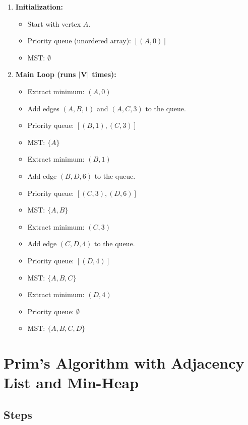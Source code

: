 \documentclass{article}
\begin{document}
\begin{enumerate}
    \item \textbf{Initialization:}
    \begin{itemize}
        \item Start with vertex \( A \).
        \item Priority queue (unordered array): \( [(A, 0)] \)
        \item MST: \( \emptyset \)
    \end{itemize}
    \item \textbf{Main Loop (runs |V| times):}
    \begin{itemize}
        \item Extract minimum: \( (A, 0) \)
        \item Add edges \( (A, B, 1) \) and \( (A, C, 3) \) to the queue.
        \item Priority queue: \( [(B, 1), (C, 3)] \)
        \item MST: \( \{A\} \)
        \item Extract minimum: \( (B, 1) \)
        \item Add edge \( (B, D, 6) \) to the queue.
        \item Priority queue: \( [(C, 3), (D, 6)] \)
        \item MST: \( \{A, B\} \)
        \item Extract minimum: \( (C, 3) \)
        \item Add edge \( (C, D, 4) \) to the queue.
        \item Priority queue: \( [(D, 4)] \)
        \item MST: \( \{A, B, C\} \)
        \item Extract minimum: \( (D, 4) \)
        \item Priority queue: \( \emptyset \)
        \item MST: \( \{A, B, C, D\} \)
    \end{itemize}
\end{enumerate}

\section{Prim's Algorithm with Adjacency List and Min-Heap}

\subsection{Steps}
\end{document}
